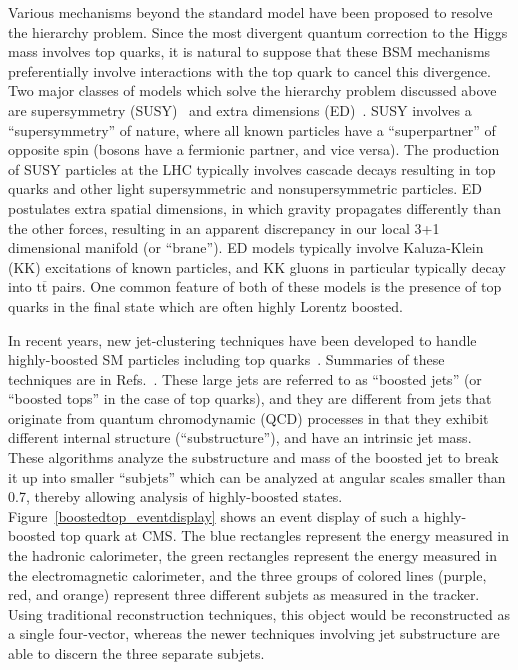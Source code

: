 \documentclass[12pt]{proposalnsf}
\newcommand{\ttbar}        {\ensuremath{\mathrm{t}\overline{\mathrm{t}}}}
\begin{document}
Various mechanisms beyond the standard model
have been proposed to resolve the hierarchy problem.
Since the most divergent 
quantum correction to the Higgs mass
involves top quarks, it is natural to suppose
that these BSM mechanisms preferentially involve interactions with the
top quark to cancel this divergence.
Two major classes of models which solve the hierarchy problem
discussed above are supersymmetry
(SUSY)~\cite{Gunion:1987qv,Feng:1999mn,Kitano:2006gv,Barbieri:2009ev,Horton:2009ed}
and extra dimensions (ED)~\cite{ed,rs1,rs2,rs_gluon_1}. SUSY involves
a ``supersymmetry'' of nature, where all known particles have a
``superpartner'' of opposite spin (bosons have a fermionic partner,
and vice versa). The production of SUSY particles at the LHC typically
involves cascade decays resulting in top quarks and other light
supersymmetric and nonsupersymmetric particles. ED postulates extra
spatial dimensions, in which gravity propagates differently than the
other forces, resulting in an apparent discrepancy in our local 3+1 dimensional
manifold (or ``brane''). ED models typically involve
Kaluza-Klein (KK) excitations of known particles, and KK gluons in
particular typically decay into $\ttbar$ pairs. 
One common feature of both of these models is the presence of top
quarks in the final state which are often highly Lorentz boosted. 



In recent years, new jet-clustering techniques have been developed to handle
highly-boosted SM particles including top
quarks~\cite{Seymour:1993mx,boostedhiggs,catop_theory,catop_cms,jetpruning1,jetpruning2,nsub,heptoptagger,trimming}.
Summaries of these techniques are in Refs.~\cite{boost2010,boost2011}.
These
large jets are referred to as 
``boosted jets'' (or ``boosted tops'' in the case of top quarks), and
they are
different from jets that originate from quantum chromodynamic (QCD)
processes in that they exhibit different internal structure
(``substructure''), and have an intrinsic jet mass. 
These algorithms
analyze the substructure and mass
of the boosted jet to break it up into smaller ``subjets'' which can be
analyzed at angular scales smaller than 0.7, thereby allowing analysis
of highly-boosted states. Figure~\ref{boostedtop_eventdisplay}
shows an event display of such a highly-boosted top quark at CMS. 
The blue rectangles represent the
energy measured in the hadronic calorimeter, the green
rectangles represent the energy measured in the electromagnetic
calorimeter, and the three groups of colored lines (purple, red,
and orange) represent three different subjets as measured in
the tracker. Using traditional reconstruction techniques, this object
would be reconstructed as a single four-vector, whereas the newer
techniques involving jet substructure are able to discern the three
separate subjets. 
\end{document}
